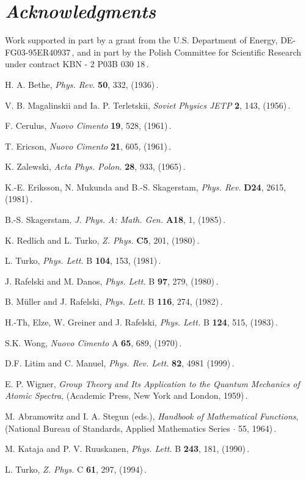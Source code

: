 \documentclass[a4paper,11pt]{article}
\begin{document}
\section*{\normalsize\it Acknowledgments}\noindent
Work supported in part by a grant from the U.S. Department of Energy,
DE-FG03-95ER40937\,, and in part by the Polish Committee for
Scientific Research under contract KBN - 2 P03B 030 18\,.
\begin{thebibliography}{99}
 H. A. Bethe, {\it Phys. Rev.} {\bf 50}, 332, (1936)\,.

V. B. Magalinskii and Ia. P. Terletskii, {\it Soviet Physics JETP}
{\bf 2}, 143,  (1956)\,.

F. Cerulus, {\it  Nuovo Cimento} {\bf 19}, 528, (1961)\,.

T. Ericson, {\it Nuovo Cimento} {\bf 21}, 605,  (1961)\,.

K. Zalewski, {\it  Acta Phys. Polon.} {\bf 28}, 933,  (1965)\,.

K.-E. Eriksson, N. Mukunda and B.-S. Skagerstam, {\it Phys. Rev.}
{\bf D24}, 2615, (1981)\,.

B.-S. Skagerstam, {\it J. Phys. A: Math. Gen.} {\bf A18}, 1,
(1985)\,.

K. Redlich and L. Turko, {\it Z. Phys.} {\bf C5}, 201,  (1980)\,.

 L. Turko, {\it Phys. Lett.} B {\bf 104}, 153,  (1981)\,.

J. Rafelski and M. Danos,  {\it Phys. Lett.} B {\bf 97}, 279,
(1980)\,.

B. M\"uller and J. Rafelski,  {\it Phys. Lett.} B {\bf 116}, 274,
(1982)\,.

H.-Th, Elze, W. Greiner and J. Rafelski, {\it Phys. Lett.} B {\bf
124}, 515, (1983)\,.

S.K. Wong, {\it Nuovo Cimento} A {\bf 65}, 689, (1970)\,.

D.F. Litim and C. Manuel, {\it Phys. Rev. Lett.} {\bf 82}, 4981
(1999)\,.

E. P. Wigner, {\it Group Theory and Its Application to the Quantum
Mechanics of Atomic Spectra}, (Academic Press, New York and
London, 1959)\,.

 M. Abramowitz and I. A. Stegun (eds.), {\it Handbook of
Mathematical Functions}, (National Bureau of Standards, Applied
Mathematics Series $\cdot$  55, 1964)\,.

M. Kataja and P. V. Ruuskanen,  {\it Phys. Lett.} B {\bf 243},
181, (1990)\,.

L. Turko, {\it Z. Phys.} C {\bf 61}, 297,  (1994)\,.

\end{thebibliography}
\end{document}
